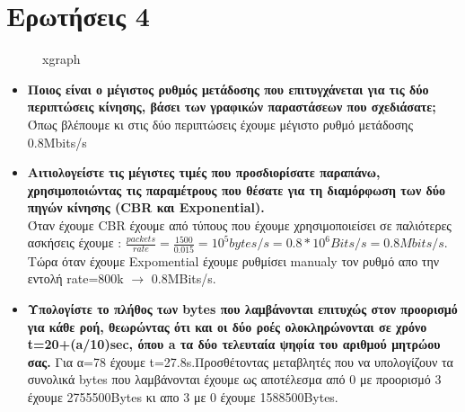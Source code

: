 \documentclass{article}
\begin{document}
\section*{Ερωτήσεις 4}
\begin{figure}[ht!]
	\centering
	\qquad
	\caption{xgraph}
	
\end{figure}
\begin{itemize}
	\item \textbf{Ποιος είναι ο μέγιστος ρυθμός μετάδοσης που επιτυγχάνεται για τις δύο περιπτώσεις
		κίνησης, βάσει των γραφικών παραστάσεων που σχεδιάσατε; } \\ Όπως βλέπουμε κι στις δύο περιπτώσεις έχουμε μέγιστο ρυθμό μετάδοσης 0.8Mbits/s
	\item \textbf{Αιτιολογείστε τις μέγιστες τιμές που προσδιορίσατε παραπάνω, χρησιμοποιώντας τις
		παραμέτρους που θέσατε για τη διαμόρφωση των δύο πηγών κίνησης (CBR και
		Exponential).}\\Όταν έχουμε CBR έχουμε από τύπους που έχουμε χρησιμοποιείσει σε παλιότερες ασκήσεις έχουμε : $\frac{packets}{rate}=\frac{1500}{0.015}=10^5bytes/s=0.8*10^6Bits/s=0.8Mbits/s$. Τώρα όταν έχουμε Expomential έχουμε ρυθμίσει manualy τον ρυθμό απο την εντολή rate=800k $\rightarrow$ 0.8MBits/s.
	\item \textbf{Υπολογίστε το πλήθος των bytes που λαμβάνονται επιτυχώς στον προορισμό για κάθε
		ροή, θεωρώντας ότι και οι δύο ροές ολοκληρώνονται σε χρόνο t=20+(a/10)sec, όπου a τα
		δύο τελευταία ψηφία του αριθμού μητρώου σας. }
	Για α=78 έχουμε t=27.8s.Προσθέτοντας μεταβλητές που να υπολογίζουν τα συνολικά bytes που λαμβάνονται έχουμε ως αποτέλεσμα από 0 με προορισμό 3 έχουμε 2755500Bytes κι απο 3 με 0 έχουμε 1588500Bytes.
	
\end{itemize}


\end{document}
